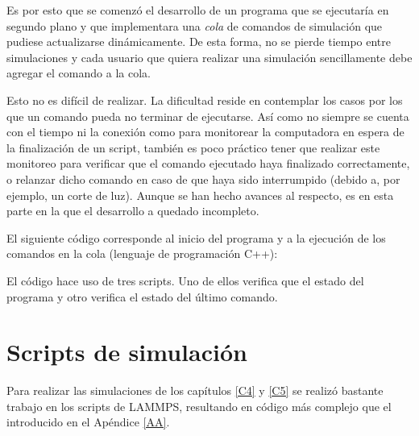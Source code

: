 Es por esto que se comenzó el desarrollo de un programa que se ejecutaría en segundo plano y que implementara una \textit{cola} de comandos de simulación que pudiese actualizarse dinámicamente. De esta forma, no se pierde tiempo entre simulaciones y cada usuario que quiera realizar una simulación sencillamente debe agregar el comando a la cola.

Esto no es difícil de realizar. La dificultad reside en contemplar los casos por los que un comando pueda no terminar de ejecutarse. Así como no siempre se cuenta con el tiempo ni la conexión como para monitorear la computadora en espera de la finalización de un script, también es poco práctico tener que realizar este monitoreo para verificar que el comando ejecutado haya finalizado correctamente, o relanzar dicho comando en caso de que haya sido interrumpido (debido a, por ejemplo, un corte de luz). Aunque se han hecho avances al respecto, es en esta parte en la que el desarrollo a quedado incompleto.

El siguiente código corresponde al inicio del programa y a la ejecución de los comandos en la cola (lenguaje de programación C++):



El código hace uso de tres scripts. Uno de ellos verifica que el estado del programa y otro verifica el estado del último comando.




\section{Scripts de simulación}

Para realizar las simulaciones de los capítulos \ref{C4} y \ref{C5} se realizó bastante trabajo en los scripts de LAMMPS, resultando en código más complejo que el introducido en el Apéndice \ref{AA}.

